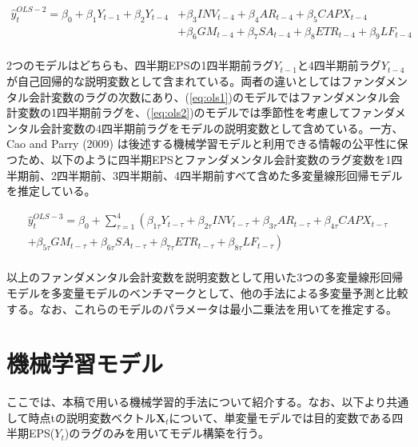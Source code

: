 \documentclass[a4paper, 12pt]{jsarticle}
\begin{document}
\begin{equation}
  \begin{split}
    \label{eq:ols2}
    \hat{y}_t^{OLS-2} = \beta_0 + \beta_1Y_{t-1} + \beta_2Y_{t-4} 
    &+ \beta_3INV_{t-4} + \beta_4AR_{t-4} + \beta_5CAPX_{t-4} \\
    &+ \beta_6GM_{t-4} + \beta_7SA_{t-4} + \beta_8ETR_{t-4} + \beta_9LF_{t-4} \\
  \end{split}
\end{equation}

2つのモデルはどちらも、四半期EPSの1四半期前ラグ$Y_{t-1}$と4四半期前ラグ$Y_{t-4}$が自己回帰的な説明変数として含まれている。両者の違いとしてはファンダメンタル会計変数のラグの次数にあり、(\ref{eq:ols1})のモデルではファンダメンタル会計変数の1四半期前ラグを、(\ref{eq:ols2})のモデルでは季節性を考慮してファンダメンタル会計変数の4四半期前ラグをモデルの説明変数として含めている。一方、Cao and Parry (2009) は後述する機械学習モデルと利用できる情報の公平性に保つため、以下のように四半期EPSとファンダメンタル会計変数のラグ変数を1四半期前、2四半期前、3四半期前、4四半期前すべて含めた多変量線形回帰モデルを推定している。

\begin{equation}
  \begin{split}
    \label{eq:ols3}
    \hat{y}_t^{OLS-3} = \beta_0 + \sum^{4}_{\tau=1} \left( \beta_{1\tau}Y_{t-\tau} 
    + \beta_{2\tau}INV_{t-\tau} + \beta_{3\tau}AR_{t-\tau} + \beta_{4\tau}CAPX_{t-\tau} \right. \\
    \left. + \beta_{5\tau}GM_{t-\tau} + \beta_{6\tau}SA_{t-\tau} + \beta_{7\tau}ETR_{t-\tau} + \beta_{8\tau}LF_{t-\tau} \right) \\
  \end{split}
\end{equation}

以上のファンダメンタル会計変数を説明変数として用いた3つの多変量線形回帰モデルを多変量モデルのベンチマークとして、他の手法による多変量予測と比較する。なお、これらのモデルのパラメータは最小二乗法を用いてを推定する。

\section{機械学習モデル}


ここでは、本稿で用いる機械学習的手法について紹介する。なお、以下より共通して時点tの説明変数ベクトル$\bm{X}_t$について、単変量モデルでは目的変数である四半期EPS($Y_t$)のラグのみを用いてモデル構築を行う。
\end{document}
